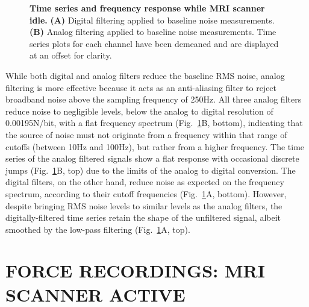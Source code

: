 \documentclass[letterpaper, 10 pt, conference]{ieeeconf}  %
\begin{document}
\begin{figure}[thpb]
  \centering
  \caption{\textbf{Time series and frequency response while MRI scanner idle.} \textbf{(A)} Digital filtering applied to baseline noise measurements. \textbf{(B)} Analog filtering applied to baseline noise measurements. Time series plots for each channel have been demeaned and are displayed at an offset for clarity.}
  \label{fig:scanner-idle}
\end{figure}

While both digital and analog filters reduce the baseline RMS noise, analog filtering is more effective because it acts as an anti-aliasing filter to reject broadband noise above the sampling frequency of 250Hz. All three analog filters reduce noise to negligible levels, below the analog to digital resolution of 0.00195N/bit, with a flat frequency spectrum (Fig.\ \ref{fig:scanner-idle}B, bottom), indicating that the source of noise must not originate from a frequency within that range of cutoffs (between 10Hz and 100Hz), but rather from a higher frequency. The time series of the analog filtered signals show a flat response with occasional discrete jumps (Fig.\ \ref{fig:scanner-idle}B, top) due to the limits of the analog to digital conversion. The digital filters, on the other hand, reduce noise as expected on the frequency spectrum, according to their cutoff frequencies (Fig.\ \ref{fig:scanner-idle}A, bottom). However, despite bringing RMS noise levels to similar levels as the analog filters, the digitally-filtered time series retain the shape of the unfiltered signal, albeit smoothed by the low-pass filtering (Fig.\ \ref{fig:scanner-idle}A, top).

\section{FORCE RECORDINGS: MRI SCANNER ACTIVE}
\end{document}
